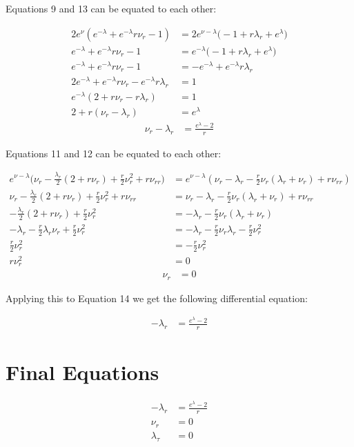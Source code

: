 \documentclass[12pt]{article}
\begin{document}
Equations 9 and 13 can be equated to each other:

\begin{align*}
  2e^{\nu} \left(e^{-\lambda} + e^{-\lambda}r \nu_r - 1\right) &= 2e^{\nu-\lambda}\Big(
  -1 + r \lambda_r + e^{\lambda} \Big) \\
  e^{-\lambda} + e^{-\lambda}r \nu_r - 1 &= e^{-\lambda}\Big( -1 + r \lambda_r + e^{\lambda} \Big) \\
  e^{-\lambda} + e^{-\lambda}r \nu_r - 1 &= -e^{-\lambda} + e^{-\lambda} r \lambda_r \\
  2e^{-\lambda} + e^{-\lambda}r \nu_r - e^{-\lambda} r \lambda_r &= 1 \\
  e^{-\lambda} \left(2 + r\nu_r -  r\lambda_r\right) &= 1 \\
  2 + r \left(\nu_r - \lambda_r\right) &= e^{\lambda}
\end{align*}
\begin{align}
  \nu_r - \lambda_r &= \frac{e^{\lambda} - 2}{r}
\end{align}

Equations 11 and 12 can be equated to each other:

\begin{align*}
  e^{\nu-\lambda} \big(\nu_r - \frac{\lambda_r}{2} (2 + r \nu_r) + \frac{r}{2}\nu_r^2 + r\nu_{rr} \big) &= e^{\nu-\lambda} (\nu_r - \lambda_r - \frac{r}{2} \nu_r (\lambda_r + \nu_r ) + r\nu_{rr}) \\
  \nu_r - \frac{\lambda_r}{2} (2 + r \nu_r) + \frac{r}{2}\nu_r^2 + r\nu_{rr} &= \nu_r - \lambda_r - \frac{r}{2} \nu_r (\lambda_r + \nu_r ) + r\nu_{rr} \\
  - \frac{\lambda_r}{2} (2 + r \nu_r) + \frac{r}{2}\nu_r^2 &= - \lambda_r - \frac{r}{2} \nu_r (\lambda_r + \nu_r ) \\
  - \lambda_r - \frac{r}{2} \lambda_r \nu_r + \frac{r}{2}\nu_r^2 &= - \lambda_r - \frac{r}{2} \nu_r \lambda_r - \frac{r}{2} \nu_r^2 \\
  \frac{r}{2}\nu_r^2 &= - \frac{r}{2} \nu_r^2 \\
  r\nu_r^2 &= 0
\end{align*}
\begin{align}
  \nu_r &= 0
\end{align}

Applying this to Equation 14 we get the following differential equation:

\begin{align}
  - \lambda_r &= \frac{e^{\lambda} - 2}{r}
\end{align}

\section*{Final Equations}

\begin{align}
  - \lambda_r &= \frac{e^{\lambda} - 2}{r} \\
  \nu_r &= 0 \\
  \lambda_\tau &= 0
\end{align}
\end{document}
